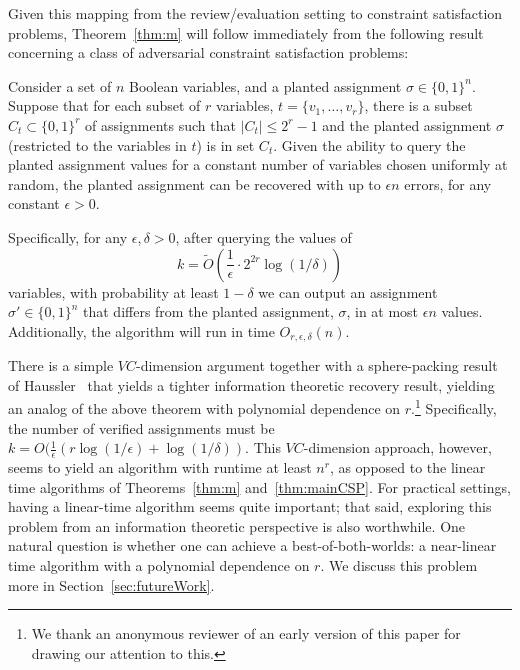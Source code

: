 \documentclass[final,12pt]{colt2018}
\newcommand{\eps}{\epsilon}
\begin{document}
Given this mapping from the review/evaluation setting to constraint satisfaction problems, Theorem~\ref{thm:m} will follow immediately from the following result concerning a class of adversarial constraint satisfaction problems:%

\begin{theorem}\label{thm:mainCSP}
Consider a set of $n$ Boolean variables, and a planted assignment $\sigma\in \{0,1\}^n.$  Suppose that for each subset of $r$ variables, $t=\{v_1,\ldots,v_r\}$, there is a subset $C_t \subset \{0,1\}^r$ of assignments such that $|C_t| \le 2^r -1$ and the planted assignment $\sigma$ (restricted to the variables in $t$) is in set $C_t$.  Given the ability to query the planted assignment values for a constant number of variables chosen uniformly at random, the planted assignment can be recovered with up to $\eps n$ errors, for any constant $\eps>0$.  

Specifically, for any $\eps,\delta>0$,  after querying the values of $$k =\tilde{O}\left(\frac{1}{\eps} \cdot 2^{2r} \log(1/\delta)\right)$$ variables, with probability at least $1-\delta$ we can output an assignment $\sigma' \in \{0,1\}^n$ that differs from the planted assignment, $\sigma$, in at most $\eps n$ values.  Additionally, the algorithm will run in time $O_{r,\eps,\delta}(n).$
\end{theorem}



There is a simple $VC$-dimension argument together with a sphere-packing result of Haussler~\citep{haussler1995sphere} that yields a tighter information theoretic recovery result, yielding an analog of the above theorem with polynomial dependence on $r$.\footnote{We thank an anonymous reviewer of an early version of this paper for drawing our attention to this.}  Specifically, the number of verified assignments must be  $k = O(\frac{1}{\eps}\left(r\log(1/\eps)+\log(1/\delta)\right)$.  This $VC$-dimension approach, however, seems to yield an algorithm with runtime at least $n^r$, as opposed to the linear time algorithms of Theorems~\ref{thm:m} and~\ref{thm:mainCSP}.  For practical settings, having a linear-time algorithm seems quite important; that said, exploring this problem from an information theoretic perspective is also worthwhile.    One natural question is whether one can achieve a best-of-both-worlds: a near-linear time algorithm with a polynomial dependence on $r$.  We discuss this problem more in Section~\ref{sec:futureWork}.
\end{document}
